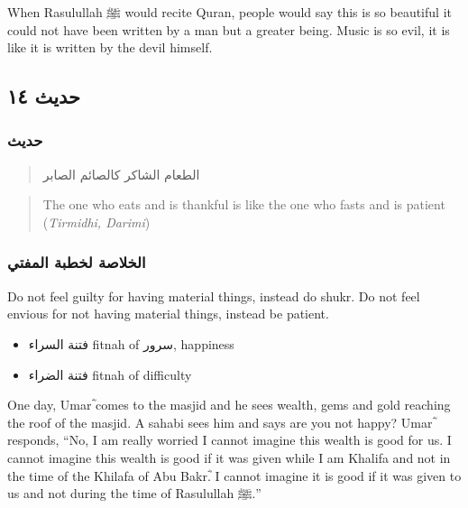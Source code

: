\documentclass[
]{book}
\providecommand{\tightlist}{%
  \setlength{\itemsep}{0pt}\setlength{\parskip}{0pt}}
\begin{document}
When Rasulullah ﷺ would recite Quran, people would say this is so beautiful it could not have been written by a man but a greater being. Music is so evil, it is like it is written by the devil himself.

\hypertarget{ux62dux62fux64aux62b-ux661ux664}{%
\subsection{حديث ١٤}\label{ux62dux62fux64aux62b-ux661ux664}}

\hypertarget{ux62dux62fux64aux62b-14}{%
\subsubsection{حديث}\label{ux62dux62fux64aux62b-14}}

\begin{quote}
الطعام الشاكر كالصائم الصابر
\end{quote}

\begin{quote}
The one who eats and is thankful is like the one who fasts and is patient (\emph{Tirmidhi, Darimi})
\end{quote}

\hypertarget{ux627ux644ux62eux644ux627ux635ux629-ux644ux62eux637ux628ux629-ux627ux644ux645ux641ux62aux64a-13}{%
\subsubsection{الخلاصة لخطبة المفتي}\label{ux627ux644ux62eux644ux627ux635ux629-ux644ux62eux637ux628ux629-ux627ux644ux645ux641ux62aux64a-13}}

Do not feel guilty for having material things, instead do shukr. Do not feel envious for not having material things, instead be patient.

\begin{itemize}
\tightlist
\item
  فتنة السراء fitnah of سرور, happiness
\item
  فتنة الضراء fitnah of difficulty
\end{itemize}

One day, Umarؓ comes to the masjid and he sees wealth, gems and gold reaching the roof of the masjid. A sahabi sees him and says are you not happy? Umarؓ responds, ``No, I am really worried I cannot imagine this wealth is good for us. I cannot imagine this wealth is good if it was given while I am Khalifa and not in the time of the Khilafa of Abu Bakrؓ. I cannot imagine it is good if it was given to us and not during the time of Rasulullah ﷺ.''
\end{document}
